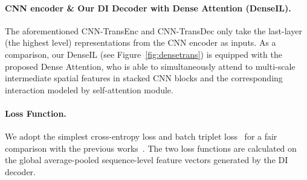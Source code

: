 \documentclass[10pt,twocolumn,letterpaper]{article}
\begin{document}
\vspace{-2mm}
\paragraph{CNN encoder \& Our DI Decoder with Dense Attention (DenseIL).}
The aforementioned CNN-TransEnc and CNN-TransDec only take the last-layer (the highest level) representations from the CNN encoder as inputs. As a comparison, our DenseIL (see Figure~\ref{fig:densetrans}) is equipped with the proposed Dense Attention, who is able to simultaneously attend to multi-scale intermediate spatial features in stacked CNN blocks and the corresponding interaction modeled by self-attention module.

\vspace{-2mm}
\paragraph{Loss Function.}
We adopt the simplest cross-entropy loss and batch triplet loss~\cite{hermans2017defense} for a fair comparison with the previous works~\cite{subramaniam2019co,hou2020temporal,gu2020appearance}. The two loss functions are calculated on the global average-pooled sequence-level feature vectors generated by the DI decoder.
\end{document}
